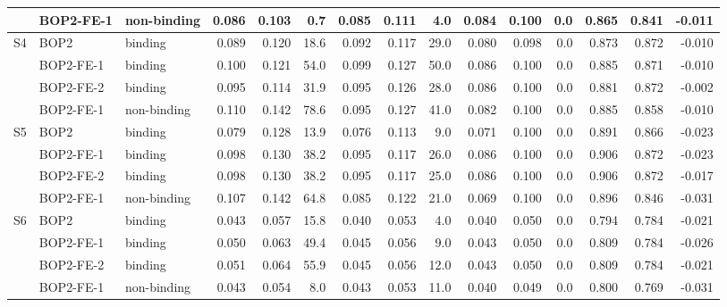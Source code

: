 \begin{table}
\begin{tabular}{lllrrrrrrrrrrrr}
 & BOP2-FE-1 & non-binding & 0.086 & 0.103 & 0.7 & 0.085 & 0.111 & 4.0 & 0.084 & 0.100 & 0.0 & 0.865 & 0.841 & -0.011 \\
\midrule
S4 & BOP2 & binding & 0.089 & 0.120 & 18.6 & 0.092 & 0.117 & 29.0 & 0.080 & 0.098 & 0.0 & 0.873 & 0.872 & -0.010 \\
 & BOP2-FE-1 & binding & 0.100 & 0.121 & 54.0 & 0.099 & 0.127 & 50.0 & 0.086 & 0.100 & 0.0 & 0.885 & 0.871 & -0.010 \\
 & BOP2-FE-2 & binding & 0.095 & 0.114 & 31.9 & 0.095 & 0.126 & 28.0 & 0.086 & 0.100 & 0.0 & 0.881 & 0.872 & -0.002 \\
 & BOP2-FE-1 & non-binding & 0.110 & 0.142 & 78.6 & 0.095 & 0.127 & 41.0 & 0.082 & 0.100 & 0.0 & 0.885 & 0.858 & -0.010 \\
\midrule
S5 & BOP2 & binding & 0.079 & 0.128 & 13.9 & 0.076 & 0.113 & 9.0 & 0.071 & 0.100 & 0.0 & 0.891 & 0.866 & -0.023 \\
 & BOP2-FE-1 & binding & 0.098 & 0.130 & 38.2 & 0.095 & 0.117 & 26.0 & 0.086 & 0.100 & 0.0 & 0.906 & 0.872 & -0.023 \\
 & BOP2-FE-2 & binding & 0.098 & 0.130 & 38.2 & 0.095 & 0.117 & 25.0 & 0.086 & 0.100 & 0.0 & 0.906 & 0.872 & -0.017 \\
 & BOP2-FE-1 & non-binding & 0.107 & 0.142 & 64.8 & 0.085 & 0.122 & 21.0 & 0.069 & 0.100 & 0.0 & 0.896 & 0.846 & -0.031 \\
\midrule
S6 & BOP2 & binding & 0.043 & 0.057 & 15.8 & 0.040 & 0.053 & 4.0 & 0.040 & 0.050 & 0.0 & 0.794 & 0.784 & -0.021 \\
 & BOP2-FE-1 & binding & 0.050 & 0.063 & 49.4 & 0.045 & 0.056 & 9.0 & 0.043 & 0.050 & 0.0 & 0.809 & 0.784 & -0.026 \\
 & BOP2-FE-2 & binding & 0.051 & 0.064 & 55.9 & 0.045 & 0.056 & 12.0 & 0.043 & 0.050 & 0.0 & 0.809 & 0.784 & -0.021 \\
 & BOP2-FE-1 & non-binding & 0.043 & 0.054 & 8.0 & 0.043 & 0.053 & 11.0 & 0.040 & 0.049 & 0.0 & 0.800 & 0.769 & -0.031 \\
\bottomrule
\end{tabular}
\par\medskip
\begin{minipage}{0.95\textwidth}
\footnotesize

\end{minipage}
\end{table}
